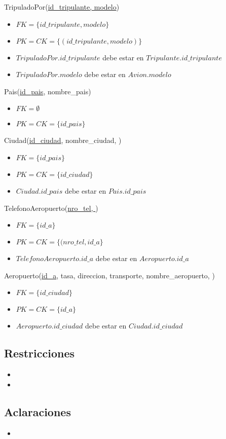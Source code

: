 \vspace*{0.5cm}
\noindent
TripuladoPor(\underline{id\_tripulante, modelo})
\begin{itemize}
	\item $FK = \{id\_tripulante, modelo\}$
	\item $PK = CK = \{(id\_tripulante, modelo)\}$
	\item $TripuladoPor.id\_tripulante$ debe estar en
		$Tripulante.id\_tripulante$
	\item $TripuladoPor.modelo$ debe estar en $Avion.modelo$
\end{itemize}

\vspace*{0.5cm}
\noindent
Pais(\underline{id\_pais}, nombre\_pais)
\begin{itemize}
	\item $FK = \emptyset$
	\item $PK = CK = \{id\_pais\}$
\end{itemize}


\vspace*{0.5cm}
\noindent
Ciudad(\underline{id\_ciudad}, nombre\_ciudad, )
\begin{itemize}
	\item $FK = \{id\_pais\}$
	\item $PK = CK = \{id\_ciudad\}$
	\item $Ciudad.id\_pais$ debe estar en $Pais.id\_pais$
\end{itemize}

\vspace*{0.5cm}
\noindent
TelefonoAeropuerto(\underline{nro\_tel, })
\begin{itemize}
	\item $FK = \{id\_a\}$
	\item $PK = CK = \{(nro\_tel, id\_a\}$
	\item $TelefonoAeropuerto.id\_a$ debe estar en $Aeropuerto.id\_a$
\end{itemize}


\vspace*{0.5cm}
\noindent
Aeropuerto(\underline{id\_a}, tasa, direccion, transporte, nombre\_aeropuerto,
	)
\begin{itemize}
	\item $FK = \{id\_ciudad\}$
	\item $PK = CK = \{id\_a\}$
	\item $Aeropuerto.id\_ciudad$ debe estar en $Ciudad.id\_ciudad$
\end{itemize}

\subsection{Restricciones}
\begin{itemize}
  \item
  
  \item
\end{itemize}

\subsection{Aclaraciones}
\begin{itemize}
  \item

\end{itemize}
